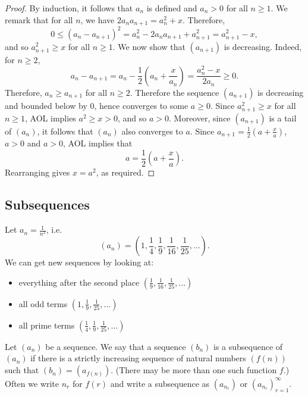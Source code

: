 \documentclass[11pt]{article}
\begin{document}
\begin{proof}
    By induction, it follows that $a_n$ is defined and $a_n > 0$ for all $n \geq 1$. We remark that for all $n$, we have $2a_n a_{n+1} = a_n^2 + x$. Therefore,
    \[
        0 \leq (a_n - a_{n+1})^2 = a_n^2 - 2a_n a_{n+1} + a_{n+1}^2 = a_{n+1}^2 - x,
    \]
    and so $a_{n+1}^2 \geq x$ for all $n \geq 1$. We now show that $(a_{n+1})$ is
    decreasing. Indeed, for $n \geq 2$,
    \[
        a_n - a_{n+1} = a_n - \frac{1}{2} \left( a_n + \frac{x}{a_n} \right) = \frac{a_n^2 - x}{2a_n} \geq 0.
    \]
    Therefore, $a_n \geq a_{n+1}$ for all $n \geq 2$. Therefore the sequence
    $(a_{n+1})$ is decreasing and bounded below by $0$, hence converges to some $a
        \geq 0$. Since $a_{n+1}^2 \geq x$ for all $n \geq 1$, AOL implies $a^2 \geq x >
        0$, and so $a > 0$. Moreover, since $(a_{n+1})$ is a tail of $(a_n)$, it
    follows that $(a_n)$ also converges to $a$. Since $a_{n+1} = \frac{1}{2} \left(
        a + \frac{x}{a} \right)$, $a > 0$ and $a > 0$, AOL implies that
    \[
        a = \frac{1}{2} \left( a + \frac{x}{a} \right).
    \]
    Rearranging gives $x = a^2$, as required.
\end{proof}

\subsection{Subsequences}

\begin{example}\label{2.4.1}
    Let $a_n = \frac{1}{n^2}$, i.e.
    \[
        (a_n) = \left( 1, \frac{1}{4}, \frac{1}{9}, \frac{1}{16}, \frac{1}{25}, \ldots \right).
    \]
    We can get new sequences by looking at:
    \begin{itemize}
        \item everything after the second place $\left( \frac{1}{9}, \frac{1}{16},
                  \frac{1}{25}, \ldots \right)$
        \item all odd terms $\left( 1, \frac{1}{9}, \frac{1}{25}, \ldots \right)$
        \item all prime terms $\left( \frac{1}{4}, \frac{1}{9}, \frac{1}{25}, \ldots \right)$
    \end{itemize}
\end{example}

\begin{definition}\label{2.4.2}
    Let $(a_n)$ be a sequence. We say that a sequence $(b_n)$ is a subsequence of $(a_n)$ if there is a strictly increasing sequence of natural numbers $(f(n))$ such that $(b_n) = (a_{f(n)})$. (There may be more than one such function $f$.) Often we write $n_r$ for $f(r)$ and write a subsequence as $(a_{n_r})$ or $(a_{n_r})_{r=1}^\infty$.
\end{definition}
\end{document}
